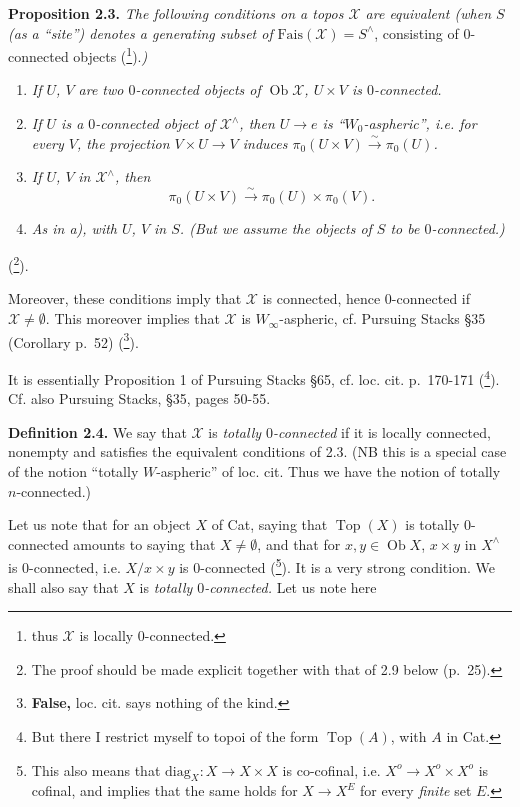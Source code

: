 \documentclass[11pt]{article}
\newcommand{\printedpage}[1]{\marginpar{\footnotesize p.~#1}}
\newcommand{\msp}[1]{\marginpar{\footnotesize [#1]}}
\newcommand{\sX}{\mathcal{X}} %
\begin{document}
\noindent\textbf{Proposition 2.3.} \textit{The following conditions on a topos $\sX$ are equivalent (when $S$ (as a ``site'') denotes a generating subset of} $\mathrm{Fais}(\sX) = S^{\wedge}$, consisting of 0-connected objects (\footnote[23]{thus $\sX$ is locally 0-connected.}).\textit{)}
\begin{enumerate}[label={},leftmargin=3em]
\item[\textit{a)}] \textit{If $U$, $V$ are two $0$-connected objects of $\operatorname{Ob} \sX$, $U \times V$ is $0$-connected.}
\item[\textit{b)}] \textit{If $U$ is a $0$-connected object of $\sX^{\wedge}$, then $U \longrightarrow e$ is ``$W_0$-aspheric'', i.e. for every $V$, the projection $V \times U \longrightarrow V$ induces $\pi_0(U \times V) \xrightarrow{\sim} \pi_0(U)$.}
\item[\textit{c)}] \textit{If $U$, $V$} \textit{in $\sX^{\wedge}$, then}
\[
\pi_0(U \times V) \xrightarrow{\sim} \pi_0(U) \times \pi_0(V).
\]
\item[\textit{d)}] \textit{As in a), with $U$, $V$ in $S$. (But we assume the objects of $S$ to be $0$-connected.)}
\end{enumerate}
\noindent(\footnote[24]{The proof should be made explicit together with that of 2.9 below (p.~25).}). %

\msp{page 18}

\noindent Moreover, these conditions imply that $\sX$ is connected, hence 0-connected if $\sX \neq \emptyset$. This moreover implies that $\sX$ is $W_{\infty}$-aspheric, cf. Pursuing Stacks §35 (Corollary p.~52) (\footnote[25]{\textbf{False,} loc. cit. says nothing of the kind.}).

It is essentially Proposition 1 of Pursuing Stacks §65, cf. loc. cit. p.~170-171 (\footnote[26]{But there I restrict myself to topoi of the form $\operatorname{Top}(A)$, with $A$ in Cat.}). Cf. also Pursuing Stacks, §35, pages 50-55.

\printedpage{12}

\noindent\textbf{Definition 2.4.} We say that $\sX$ is \textit{totally $0$-connected} if it is locally connected, nonempty and satisfies the equivalent conditions of 2.3. (NB this is a special case of the notion ``totally $W$-aspheric'' of loc. cit. Thus we have the notion of totally $n$-connected.)

Let us note that for an object $X$ of Cat, saying that $\operatorname{Top}(X)$ is totally 0-connected amounts to saying that $X \neq \emptyset$, and that for $x, y \in \operatorname{Ob} X$, $x \times y$ in $X^{\wedge}$ is 0-connected, i.e. $X/x \times y$ is 0-connected (\footnote[27]{This also means that $\mathrm{diag}_X : X \longrightarrow X \times X$ is co-cofinal, i.e. $X^o \longrightarrow X^o \times X^o$ is cofinal, and implies that the same holds for $X \longrightarrow X^E$ for every \textit{finite} set $E$.}). It is a very strong condition. We shall also say that $X$ is \textit{totally $0$-connected.} Let us note here
\end{document}
